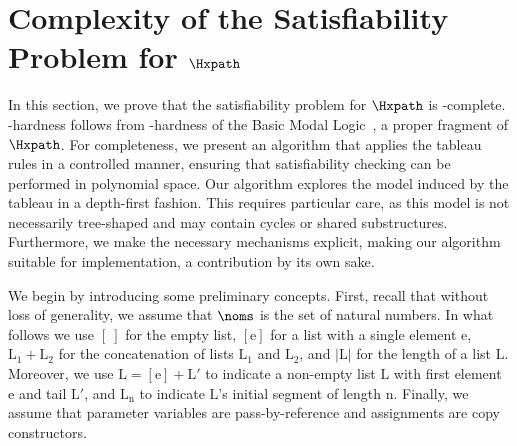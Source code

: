 \section{Complexity of the Satisfiability Problem for $\Hxpath$}
\label{sec:complexity}

In this section, we prove that the satisfiability problem for $\Hxpath$ is \pspace-complete.
\pspace-hardness follows from \pspace-hardness of the Basic Modal Logic~\cite{blackburn2001modal,blackburn06}, a proper fragment of $\Hxpath$.
For completeness, we present an algorithm that applies the tableau rules in a controlled manner, ensuring that satisfiability checking can be performed in polynomial space.
Our algorithm explores the model induced by the tableau in a depth-first fashion.
This requires particular care, as this model is not necessarily tree-shaped and may contain cycles or shared substructures.
Furthermore, we make the necessary mechanisms explicit, making our algorithm suitable for implementation, a contribution by its own sake.





We begin by introducing some preliminary concepts. 
First, recall that without loss of generality, we assume that $\noms$ is the set of natural numbers. 
In what follows we use
$[~]$ for the empty list,
$[\mathrm{e}]$ for a list with a single element $\mathrm{e}$,
$\mathrm{L}_1 + \mathrm{L}_2$ for the concatenation of lists $\mathrm{L}_1$ and $\mathrm{L}_2$,
and
$|\mathrm{L}|$ for the length %
of a list $\mathrm{L}$.
Moreover, we use $\mathrm{L} = [\mathrm{e}]+\mathrm{L}'$ to indicate a non-empty list $\mathrm{L}$ with first element $\mathrm{e}$ and tail $\mathrm{L}'$, and $\mathrm{L}_{\mathrm{n}}$ to indicate $\mathrm{L}$'s initial segment of length $\mathrm{n}$.
Finally, we assume that parameter variables are pass-by-reference and assignments are copy constructors.

